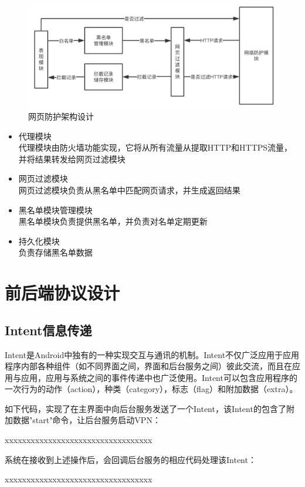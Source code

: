 \documentclass[format=final, language=chinese, degree=fyp]{hustthesis}
\begin{document}
\begin{figure}[!h]
\centering
\includegraphics[width=.6\textwidth]{function_3_ori.png}
\caption{网页防护架构设计}\label{fig:4-3}
\end{figure}



\begin{itemize}
    \item 代理模块\\ 代理模块由防火墙功能实现，它将从所有流量从提取HTTP和HTTPS流量，并将结果转发给网页过滤模块
    \item 网页过滤模块\\ 网页过滤模块负责从黑名单中匹配网页请求，并生成返回结果
    \item 黑名单模块管理模块\\ 黑名单模块负责提供黑名单，并负责对名单定期更新
    \item 持久化模块\\ 负责存储黑名单数据
\end{itemize}


\section{前后端协议设计}

\subsection{Intent信息传递}

Intent是Android中独有的一种实现交互与通讯的机制。Intent不仅广泛应用于应用程序内部各种组件（如不同界面之间，界面和后台服务之间）彼此交流，而且在应用与应用，应用与系统之间的事件传递中也广泛使用。Intent可以包含应用程序的一次行为的动作（action），种类（category），标志（flag）和附加数据（extra）。

如下代码，实现了在主界面中向后台服务发送了一个Intent，该Intent的包含了附加数据"start"命令，让后台服务启动VPN：

    xxxxxxxxxxxxxxxxxxxxxxxxxxxxxxxxxx

系统在接收到上述操作后，会回调后台服务的相应代码处理该Intent：

    xxxxxxxxxxxxxxxxxxxxxxxxxxxxxxxxxx
\end{document}

